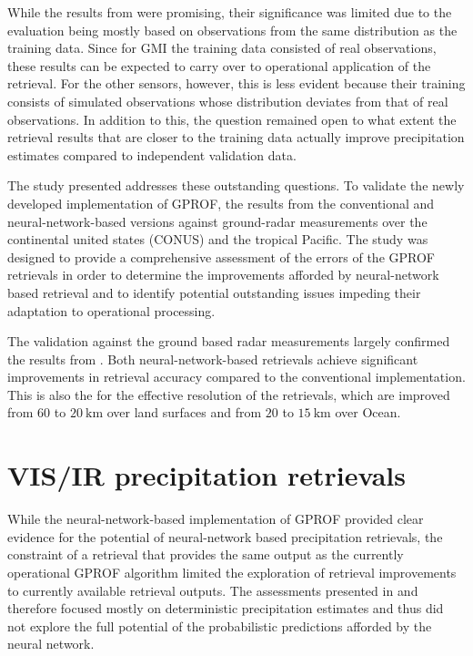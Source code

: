 While the results from \citet{pfreundschuh22} were promising, their significance
was limited due to the evaluation being mostly based on observations from the
same distribution as the training data. Since for GMI the training data
consisted of real observations, these results can be expected to carry over to
operational application of the retrieval. For the other sensors, however, this
is less evident because their training consists of simulated observations whose
distribution deviates from that of real observations. In addition to this, the
question remained open to what extent the retrieval results that are closer to
the training data actually improve precipitation estimates compared to
independent validation data.

The study presented \citet{pfreundschuh22c} addresses these outstanding
questions. To validate the newly developed implementation of GPROF, the results
from the conventional and neural-network-based versions against ground-radar
measurements over the continental united states (CONUS) and the tropical
Pacific. The study was designed to provide a comprehensive assessment of the
errors of the GPROF retrievals in order to determine the improvements afforded
by neural-network based retrieval and to identify potential outstanding issues
impeding their adaptation to operational processing.

The validation against the ground based radar measurements largely confirmed the
results from \citet{pfreundschuh22}. Both neural-network-based retrievals
achieve significant improvements in retrieval accuracy compared to the
conventional implementation. This is also the for the effective resolution of
the retrievals, which are improved from $60$ to $\SI{20}{\kilo \meter}$ over
land surfaces and from $20$ to $\SI{15}{\kilo \meter}$ over Ocean.

\section{VIS/IR precipitation retrievals}

While the neural-network-based implementation of GPROF provided clear evidence
for the potential of neural-network based precipitation retrievals, the
constraint of a retrieval that provides the same output as the currently
operational GPROF algorithm limited the exploration of retrieval improvements to
currently available retrieval outputs. The assessments presented in
\citet{pfreundschuh22} and \citet{pfreundschuh22c} therefore focused mostly on
deterministic precipitation estimates and thus did not explore the full
potential of the probabilistic predictions afforded by the neural network.

